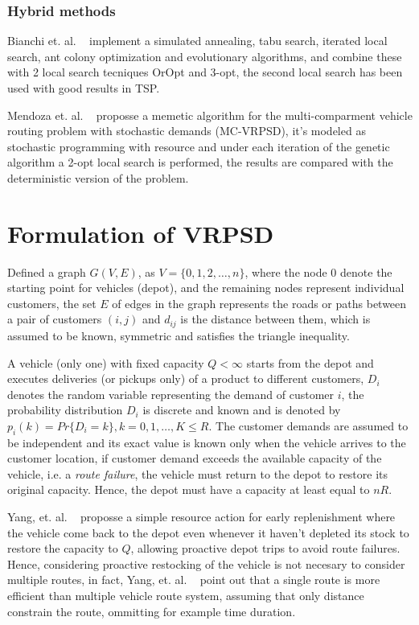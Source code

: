 \subsubsection{Hybrid methods}

Bianchi et. al. ~\cite{bianchi_hybrid_2006} implement a simulated annealing, tabu search, iterated local search, ant colony optimization and evolutionary algorithms, and combine these with 2 local search tecniques OrOpt and 3-opt, the second local search has been used with good results in TSP.

Mendoza et. al. ~\cite{mendoza_memetic_2010} proposse a memetic algorithm for the multi-comparment vehicle routing problem with stochastic demands (MC-VRPSD), it's modeled as stochastic programming with resource and under each iteration of the genetic algorithm a 2-opt local search is performed, the results are compared with the deterministic version of the problem.

\section{Formulation of VRPSD}\label{sec:Form_VRPSD}

Defined a graph $G(V,E)$, as $V = \{0, 1, 2,\ldots,n\}$, where the node 0 denote the starting point for vehicles (depot), and the remaining nodes represent individual customers, the set $E$ of edges in the graph represents the roads or paths between a pair of customers $(i,j)$ and $d_{ij}$ is the distance between them, which is assumed to be known, symmetric and satisfies the triangle inequality.

A vehicle (only one) with fixed capacity $Q < \infty$ starts from the depot and executes deliveries (or pickups only) of a product to different customers, $D_i$ denotes the random variable representing the demand of customer $i$, the probability distribution $D_i$ is discrete and known and is denoted by $p_i(k)= Pr\{D_i=k\}, k=0,1,\ldots,K \leq R$. The customer demands are assumed to be independent and its exact value is known only when the vehicle arrives to the customer location, if customer demand exceeds the available capacity of the vehicle, i.e. a \textit{route failure}, the vehicle must return to the depot to restore its original capacity. Hence, the depot must have a capacity at least equal to $nR$. %

Yang, et. al. ~\cite{yang_stochastic_2000} proposse a simple resource action for early replenishment where the vehicle come back to the depot even whenever it haven't depleted its stock to restore the capacity to $Q$, allowing proactive depot trips to avoid route failures. Hence, considering proactive restocking of the vehicle is not necesary to consider multiple routes, in fact, Yang, et. al. ~\cite{yang_stochastic_2000} point out that a single route is more efficient than multiple vehicle route system, assuming that only distance constrain the route, ommitting for example time duration.

